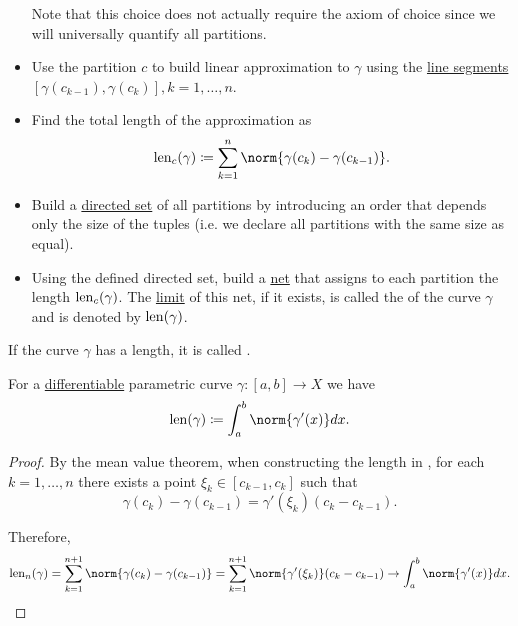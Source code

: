\begin{definition}
\begin{itemize}
          Note that this choice does not actually require the axiom of choice since we will universally quantify all partitions.

    \item Use the partition \( c \) to build linear approximation to \( \gamma \) using the \hyperref[def:convex_set/line_segment]{line segments} \( [\gamma(c_{k-1}), \gamma(c_k)], k = 1, \ldots, n \).

    \item Find the total length of the approximation as
          \begin{equation*}
            \len_c (\gamma) \coloneqq \sum_{k=1}^n \norm{\gamma(c_k) - \gamma(c_{k-1})}.
          \end{equation*}

    \item Build a \hyperref[def:directed_set]{directed set} of all partitions by introducing an order that depends only the size of the tuples (i.e. we declare all partitions with the same size as equal).

    \item Using the defined directed set, build a \hyperref[def:topological_net]{net} that assigns to each partition the length \( \operatorname{len}_c(\gamma) \). The \hyperref[def:net_convergence/limit]{limit} of this net, if it exists, is called the  of the curve \( \gamma \) and is denoted by \( \operatorname{len}(\gamma) \).
  \end{itemize}

  If the curve \( \gamma \) has a length, it is called .
\end{definition}

\begin{proposition}\label{thm:length_of_smooth_curves}
  For a \hyperref[def:differentiability/frechet]{differentiable} parametric curve \( \gamma: [a, b] \to X \) we have
  \begin{equation*}
    \len(\gamma) \coloneqq \int_a^b \norm{\gamma'(x)} dx.
  \end{equation*}
\end{proposition}
\begin{proof}
  By the mean value theorem, when constructing the length in , for each \( k = 1, \ldots, n \) there exists a point \( \xi_k \in [c_{k-1}, c_k] \) such that
  \begin{equation*}
    \gamma(c_k) - \gamma(c_{k-1}) = \gamma'(\xi_k) (c_k - c_{k-1}).
  \end{equation*}

  Therefore,
  \begin{equation*}
    \len_n (\gamma)
    =
    \sum_{k=1}^{n+1} \norm{\gamma(c_k) - \gamma(c_{k-1})}
    =
    \sum_{k=1}^{n+1} \norm{\gamma'(\xi_k)} (c_k - c_{k-1})
    \to
    \int_a^b \norm{\gamma'(x)} dx.
  \end{equation*}
\end{proof}


